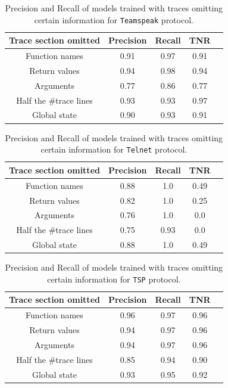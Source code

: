 \begin{table}[]
\centering
\begin{tabular}{|c|c|c|c|c|}
	\hline
	Trace section omitted   & {Precision} & {Recall} & TNR\\ 
	\hline \hline
	Function names  & 0.91 & 0.97 & 0.91 \\ \hline 
	Return values & 0.94 & 0.98 & 0.94 \\ \hline
	Arguments & 0.77  & 0.86 & 0.77 \\ \hline
	Half the \#trace lines & 0.93 & 0.93 & 0.97 \\ \hline
	Global state & 0.90 & 0.93 & 0.91 \\ \hline 
\end{tabular}
\caption{Precision and Recall of models trained with traces omitting certain information for \texttt{Teamspeak} protocol. }
\label{tab:teamspeak_removed_trace}
\end{table}


\begin{table}[]
\centering
\begin{tabular}{|c|c|c|c|c|}
	\hline
	Trace section omitted   & {Precision} & {Recall} & TNR\\ 
	\hline \hline
	Function names  & 0.88 & 1.0 & 0.49 \\ \hline 
	Return values & 0.82 & 1.0 & 0.25 \\ \hline
	Arguments & 0.76  & 1.0 & 0.0 \\ \hline
	Half the \#trace lines & 0.75 & 0.93 & 0.0 \\ \hline
	Global state & 0.88 & 1.0 & 0.49 \\ \hline 
\end{tabular}
\caption{Precision and Recall of models trained with traces omitting certain information for \texttt{Telnet} protocol. }
\label{tab:telnet_removed_trace}
\end{table}
%
\begin{table}[]
\centering
\begin{tabular}{|c|c|c|c|c|}
	\hline
	Trace section omitted   & {Precision} & {Recall} & TNR\\ 
	\hline \hline
	Function names  & 0.96 & 0.97 & 0.96 \\ \hline 
	Return values & 0.94 & 0.97 & 0.96 \\ \hline
	Arguments & 0.94  & 0.97 & 0.96 \\ \hline
	Half the \#trace lines & 0.85 & 0.94 & 0.90 \\ \hline
	Global state & 0.93 & 0.95 & 0.92 \\ \hline 
\end{tabular}
\caption{Precision and Recall of models trained with traces omitting certain information for \texttt{TSP} protocol. }
\label{tab:tsp_removed_trace}
\end{table}

